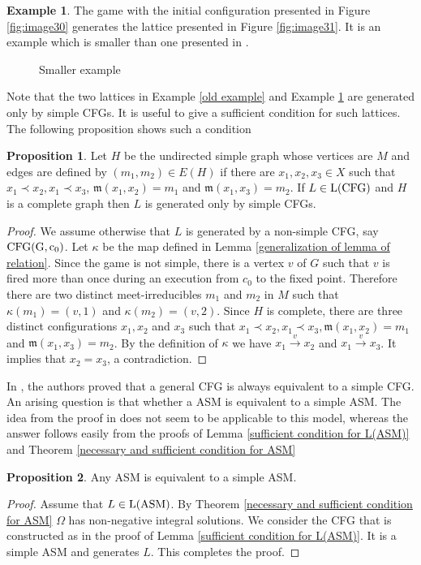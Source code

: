 \documentclass{article}
\theoremstyle{definition}
\newtheorem{examp}{Example}
\newtheorem{prop}{Proposition}
\begin{document}
\begin{examp}
\label{smaller example}
The game with the initial configuration presented in Figure \ref{fig:image30} generates the lattice presented in Figure \ref{fig:image31}. It is an example which is smaller than one presented in \cite{Mag03}. 
\begin{figure}[h]
\centering
{}
\qquad \qquad
{}
\caption{Smaller example}
\label{fig:image3031}
\end{figure}
\end{examp}
Note that the two lattices in Example \ref{old example} and Example \ref{smaller example} are generated only by simple CFGs. It is useful to give a sufficient condition for such lattices. The following proposition shows such a condition
\begin{prop} 
Let $H$ be the undirected simple graph whose vertices are $M$ and edges are defined by $(m_1,m_2) \in E(H)$ if there are $x_1,x_2,x_3 \in X$ such that $x_1 \prec x_2, x_1 \prec x_3$, $\mathfrak{m}(x_1,x_2)=m_1$ and $\mathfrak{m}(x_1,x_3)=m_2$. If $L \in {\rm L(CFG)}$ and $H$ is a complete graph then $L$ is generated only by simple CFGs.
\end{prop}
\begin{proof}
We assume otherwise that $L$ is generated by a non-simple CFG, say ${\rm CFG(G,c_0)}$. Let $\kappa$ be the map defined in Lemma \ref{generalization of lemma of relation}. Since the game is not simple, there is a vertex $v$ of $G$  such that $v$ is fired more than once during an execution from $c_0$ to the fixed point. Therefore there are two distinct meet-irreducibles $m_1$ and $m_2$ in $M$ such that $\kappa(m_1)=(v,1)$ and $\kappa(m_2)=(v,2)$. Since $H$ is complete, there are three distinct configurations $x_1,x_2$ and $x_3$ such that $x_1\prec x_2,x_1\prec x_3,\mathfrak{m}(x_1,x_2)=m_1$ and $\mathfrak{m}(x_1,x_3)=m_2$. By the definition of $\kappa$ we have $x_1\overset{v}{\to}x_2$ and $x_1\overset{v}{\to}x_3$. It implies that $x_2=x_3$, a contradiction.
\end{proof}

In \cite{MVP01}, the authors proved that a general CFG  is always equivalent to a simple CFG. An arising question is that whether a ASM is equivalent to a simple ASM. The idea from the proof in \cite{MVP01} does not seem to be applicable to this model, whereas the answer follows easily from the proofs of Lemma \ref{sufficient condition for L(ASM)} and Theorem \ref{necessary and sufficient condition for ASM}
\begin{prop}
Any ASM is equivalent to a simple  ASM.
\end{prop}
\begin{proof}
Assume that $L\in {\rm L(ASM)}$. By Theorem \ref{necessary and sufficient condition for ASM} $\Omega$ has non-negative integral solutions. We consider the CFG that is constructed as in the proof of Lemma \ref{sufficient condition for L(ASM)}. It is a simple ASM and generates $L$. This completes the proof.
\end{proof}
\end{document}
